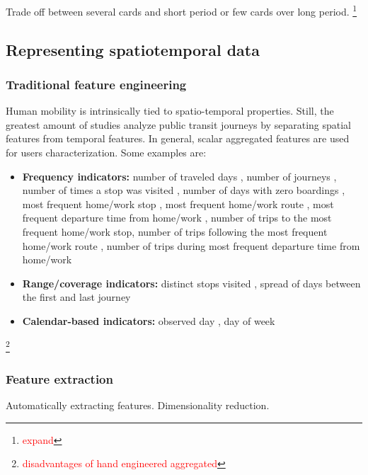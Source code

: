 \documentclass{article}
\newcommand{\selfnote}[1]{\footnote{\textcolor{red}{#1}}}
\begin{document}
Trade off between several cards and short period or few cards over long period. \selfnote{expand}

\subsection{Representing spatiotemporal data}

\subsubsection{Traditional feature engineering}
Human mobility is intrinsically tied to spatio-temporal properties. Still, the greatest amount of studies analyze public transit journeys by separating spatial features from temporal features. In general, scalar aggregated features are used for users characterization. Some examples are:

\begin{itemize}
\item \textbf{Frequency indicators:} number of traveled days \cite{bhaskar2015passenger} \cite{langlois2016inferring} \cite{ma2017understanding}, number of journeys \cite{bhaskar2015passenger}, number of times a stop was visited \cite{morency2007measuring}, number of days with zero boardings \cite{morency2007measuring}, most frequent home/work stop \cite{ma2017understanding}, most frequent home/work route \cite{ma2017understanding}, most frequent departure time from home/work \cite{ma2017understanding}, number of trips to the most frequent home/work stop\cite{ma2017understanding}, number of trips following the most frequent home/work route \cite{ma2017understanding}, number of trips during most frequent departure time from home/work \cite{ma2017understanding}

\item \textbf{Range/coverage indicators:} distinct stops visited \cite{morency2007measuring}, spread of days between the first and last journey \cite{langlois2016inferring}

\item \textbf{Calendar-based indicators:} observed day \cite{morency2007measuring}, day of week \cite{morency2007measuring}

\end{itemize}


\selfnote{disadvantages of hand engineered aggregated}


\subsubsection{Feature extraction}
Automatically extracting features. Dimensionality reduction. 
\end{document}
